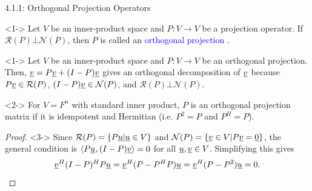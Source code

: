 \documentclass[10pt,letterpaper,english]{beamer}
\begin{document}
\begin{frame}{4.1.1: Orthogonal Projection Operators}

\begin{definition}<1->
Let $V$ be an inner-product space and $P \colon V \rightarrow V$ be a projection operator.
If $\mathcal{R}(P) \bot \mathcal{N}(P)$, then $P$ is called an \textcolor{blue}{orthogonal projection} .
\end{definition}

\begin{example}<1->
Let $V$ be an inner-product space and $P \colon V \rightarrow V$ be an orthogonal projection.
Then, $\underline{v} = P \underline{v} + (I-P) \underline{v}$ gives an orthogonal decomposition of $\underline{v}$ because $P \underline{v} \in \mathcal{R}(P)$, $(I-P) \underline{v} \in \mathcal{N}(P)$, and $\mathcal{R}(P) \bot \mathcal{N}(P)$.
\end{example}

\begin{theorem}<2->
For $V=F^n$ with standard inner product, $P$ is an orthogonal projection matrix if it is idempotent and Hermitian (i.e. $P^2=P$ and $P^H = P$).
\end{theorem}
\begin{proof}<3->
Since $\mathcal{R}(P) = \{ P\underline{u} | \underline{u}\in V \}$ and $\mathcal{N}(P) = \{ \underline{v}\in V | P\underline{v}=\underline{0} \}$, the general condition is ${\langle  P\underline{u}  \mskip1mu ,  (I-P)\underline{v}  \rangle} =0$ for all $\underline{u},\underline{v}\in V$.
Simplifying this gives \vspace{-2mm}
\[ \underline{v}^H (I-P)^H P \underline{u} = \underline{v}^H (P - P^H P) \underline{u} = \underline{v}^H (P - P^2) \underline{u} = 0.  \qedhere\]
\end{proof}

\end{frame}

\newcommand*{\vertbar}{\rule[-1ex]{0.5pt}{2.5ex}}
\end{document}
